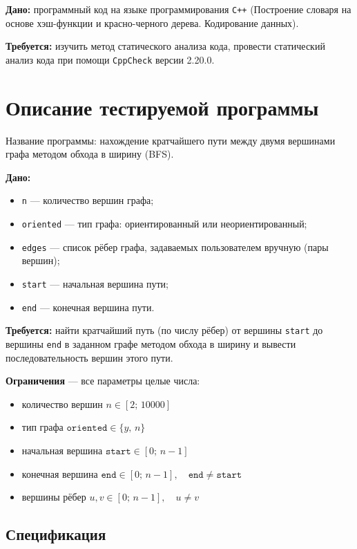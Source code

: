 \documentclass{article}[14pt]
\begin{document}
\noindent \textbf{Дано:} программный код на языке программирования \texttt{C++} (Построение словаря на основе хэш-функции и красно-черного дерева. Кодирование данных).

\noindent \textbf{Требуется:} изучить метод статического анализа кода, провести статический анализ кода при помощи \texttt{CppCheck} версии 2.20.0.

\pagebreak

\section{Описание тестируемой программы}

Название программы: нахождение кратчайшего пути между двумя вершинами графа методом обхода в ширину (BFS).
 
\textbf{Дано:}
 
\begin{itemize}
    \item \texttt{n} --- количество вершин графа;
    \item \texttt{oriented} --- тип графа: ориентированный или неориентированный;
    \item \texttt{edges} --- список рёбер графа, задаваемых пользователем вручную (пары вершин);
    \item \texttt{start} --- начальная вершина пути;
    \item \texttt{end} --- конечная вершина пути.
\end{itemize}
 
\textbf{Требуется:} найти кратчайший путь (по числу рёбер) от вершины \texttt{start} до вершины \texttt{end} в заданном графе методом обхода в ширину и вывести последовательность вершин этого пути.
 
\textbf{Ограничения} --- все параметры целые числа:
 
\begin{itemize}
    \item количество вершин $n \in [2;\, 10000]$
    \item тип графа $\mathtt{oriented} \in \{y,\, n\}$
    \item начальная вершина $\mathtt{start} \in [0;\, n-1]$
    \item конечная вершина $\mathtt{end} \in [0;\, n-1],\quad \mathtt{end} \neq \mathtt{start}$
    \item вершины рёбер $u, v \in [0;\, n-1],\quad u \neq v$
\end{itemize}
 
\subsection*{Спецификация}
 
\end{document}
